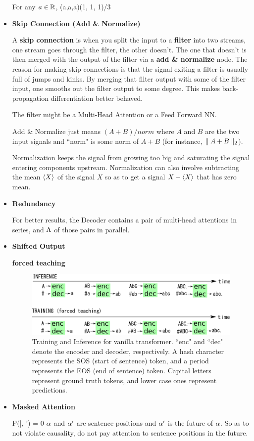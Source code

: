\begin{itemize}
For any $a\in{ \mathbb{R}}$,
\beq
(a,a,a)\rarrow (1, 1, 1)/3
\eeq


\item {\bf Skip Connection (Add \& Normalize)}

A {\bf skip connection} is when you split the
input to a {\bf filter} into two streams, one stream goes through
the filter, the other doesn't. The one that doesn't
is then merged with the output of the filter via a {\bf add \& normalize} node. The reason for making skip connections
is that the signal exiting a filter is usually full of
jumps and kinks. By merging that filter output
with some  of the filter input, one smooths out the filter output
to some degree. This makes back-propagation differentiation
better behaved.

The filter might be a Multi-Head Attention or a Feed Forward NN.

Add \& Normalize just means $(A + B)/norm$ where $A$ and $B$
are the two input signals and ``norm" is some norm of $A+B$ (for
instance, $\parallel A+B\parallel_2$).

Normalization keeps the signal from growing too big and saturating the signal entering components upstream.
Normalization can also involve subtracting the mean $\left\langle X\right\rangle$ of the signal $X$  so as to get a signal $X-\left\langle X\right\rangle$  that has zero mean.

\item {\bf Redundancy}

For better results, the Decoder contains a pair of multi-head attentions in series, and $\Lambda$ of those pairs in parallel.

\item{\bf Shifted Output}

{\bf forced teaching}


\begin{figure}[h!]
\centering
\includegraphics[width=6in]
{transformer/transformer-train-test.png}
\caption{Training and Inference for vanilla transformer.
``enc" and ``dec" denote
the encoder and decoder, respectively.
A hash character represents the SOS (start of sentence) token,
and a period represents the EOS (end of sentence) token. Capital letters represent ground
truth tokens, and lower case ones represent 
predictions.}
\label{fig-transformer-train-test}
\end{figure}

\item {\bf Masked Attention}

\beq
P(\alp|\nu, \alp') = 0 
\eeq
$\alpha$ and $\alpha'$ are
sentence positions and $\alpha'$ is the future of $\alpha$.
So as to
not violate causality,
 do not pay attention to sentence positions in the future.



\end{itemize}

